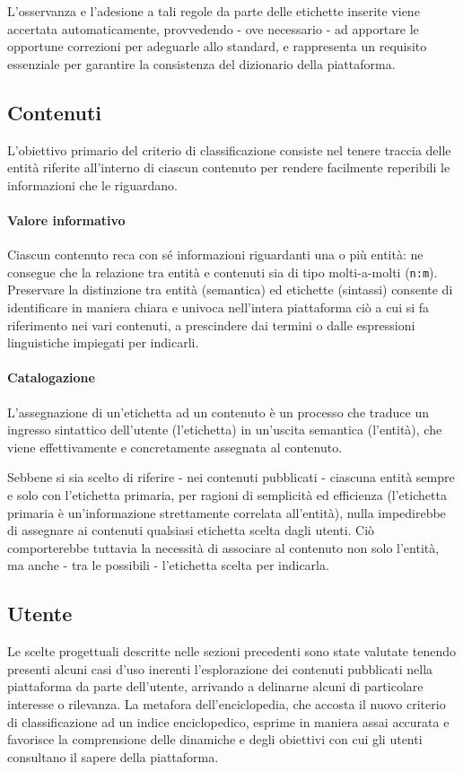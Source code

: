 L’osservanza e l’adesione a tali regole da parte delle etichette inserite viene accertata automaticamente, provvedendo - ove necessario - ad apportare le opportune correzioni per adeguarle allo standard, e rappresenta un requisito essenziale per garantire la consistenza del dizionario della piattaforma.

\subsection{Contenuti}  
L'obiettivo primario del criterio di classificazione consiste nel tenere traccia delle entità riferite all'interno di ciascun contenuto per rendere facilmente reperibili le informazioni che le riguardano.

\paragraph{Valore informativo}
Ciascun contenuto reca con sé informazioni riguardanti una o più entità: ne consegue che la relazione tra entità e contenuti sia di tipo molti-a-molti (\texttt{n:m}). Preservare la distinzione tra entità (semantica) ed etichette (sintassi) consente di identificare in maniera chiara e univoca nell'intera piattaforma ciò a cui si fa riferimento nei vari contenuti, a prescindere dai termini o dalle espressioni linguistiche impiegati per indicarli.

\paragraph{Catalogazione}
L'assegnazione di un'etichetta ad un contenuto è un processo che traduce un ingresso sintattico dell'utente (l'etichetta) in un'uscita semantica (l'entità), che viene effettivamente e concretamente assegnata al contenuto.

Sebbene si sia scelto di riferire - nei contenuti pubblicati - ciascuna entità sempre e solo con l'etichetta primaria, per ragioni di semplicità ed efficienza (l'etichetta primaria è un'informazione strettamente correlata all'entità), nulla impedirebbe di assegnare ai contenuti qualsiasi etichetta scelta dagli utenti. Ciò comporterebbe tuttavia la necessità di associare al contenuto non solo l'entità, ma anche - tra le possibili - l'etichetta scelta per indicarla.

\subsection{Utente}
Le scelte progettuali descritte nelle sezioni precedenti sono state valutate tenendo presenti alcuni casi d'uso inerenti l'esplorazione dei contenuti pubblicati nella piattaforma da parte dell'utente, arrivando a delinarne alcuni di particolare interesse o rilevanza. La metafora dell'enciclopedia, che accosta il nuovo criterio di classificazione ad un indice enciclopedico, esprime in maniera assai accurata e favorisce la comprensione delle dinamiche e degli obiettivi con cui gli utenti consultano il sapere della piattaforma. 

